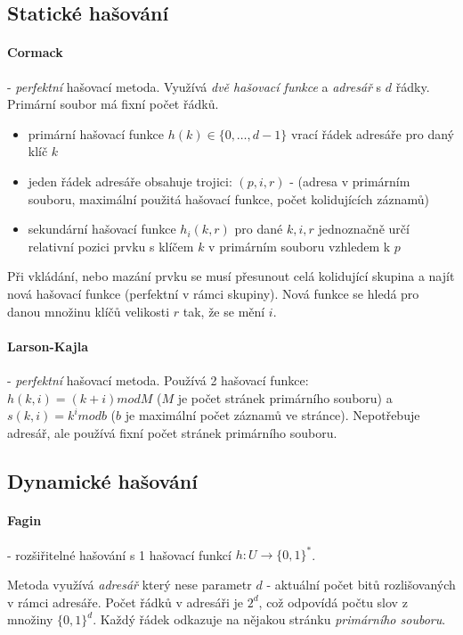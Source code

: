 \documentclass[a4paper]{article}      %
\begin{document}
\subsection{Statické hašování}

\paragraph{Cormack} - \emph{perfektní} hašovací metoda.
Využívá \emph{dvě hašovací funkce} a \emph{adresář} s $d$ řádky.
Primární soubor má fixní počet řádků.
\begin{itemize}
\item primární hašovací funkce $h(k) \in \lbrace 0, \ldots, d-1 \rbrace$ vrací řádek adresáře pro daný klíč $k$
\item jeden řádek adresáře obsahuje trojici: $(p,i,r)$ - (adresa v primárním souboru, maximální použitá hašovací funkce, počet kolidujících záznamů)
\item sekundární hašovací funkce $h_{i}(k,r)$ pro dané $k,i,r$ jednoznačně určí relativní pozici prvku s klíčem $k$ v primárním souboru vzhledem k $p$
\end{itemize}
Při vkládání, nebo mazání prvku se musí přesunout celá kolidující skupina a najít nová hašovací funkce (perfektní v rámci skupiny).
Nová funkce se hledá pro danou množinu klíčů velikosti $r$ tak, že se mění $i$.

\paragraph{Larson-Kajla} - \emph{perfektní} hašovací metoda. Používá 2 hašovací funkce: $h(k,i) = (k + i) mod M$ ($M$ je počet stránek primárního souboru) a $s(k,i)=k^{i} mod b$ ($b$ je maximální počet záznamů ve stránce).
Nepotřebuje adresář, ale používá fixní počet stránek primárního souboru.

\subsection{Dynamické hašování}

\paragraph{Fagin} - rozšiřitelné hašování s 1 hašovací funkcí $h: U \rightarrow \lbrace 0,1 \rbrace^{*}$.

Metoda využívá \emph{adresář} který nese parametr $d$ - aktuální počet bitů rozlišovaných v rámci adresáře. Počet řádků v adresáři je $2^{d}$, což odpovídá počtu slov z množiny $\lbrace 0,1 \rbrace^{d}$.
Každý řádek odkazuje na nějakou stránku \emph{primárního souboru}.
\end{document}
